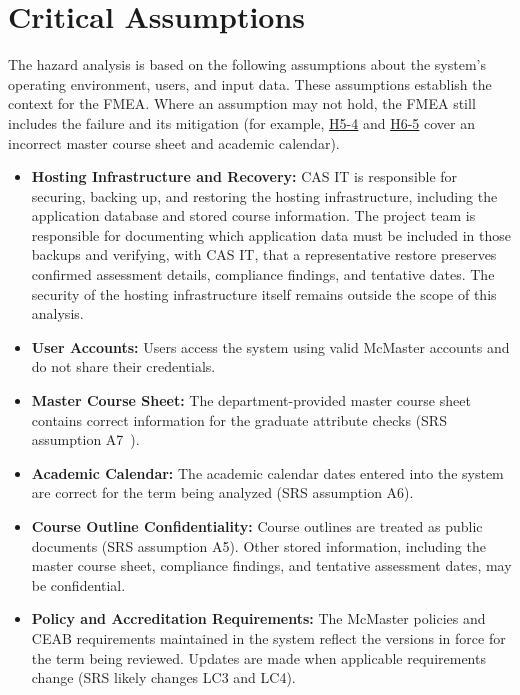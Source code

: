 \documentclass{article}
\newcommand{\hazref}[1]{\hyperref[haz:#1]{#1}}
\begin{document}
\section{Critical Assumptions} \label{sec_Assumptions}


The hazard analysis is based on the following assumptions about the system's operating environment, users, 
and input data. These assumptions establish the context for the FMEA. Where an assumption may not hold, the FMEA 
still includes the failure and its mitigation (for example, \hazref{H5-4} and \hazref{H6-5} cover an incorrect master course 
sheet and academic calendar).

\begin{itemize}
\item \textbf{Hosting Infrastructure and Recovery:} CAS IT is responsible for
securing, backing up, and restoring the hosting infrastructure, including the
application database and stored course information. The project team is
responsible for documenting which application data must be included in those
backups and verifying, with CAS IT, that a representative restore preserves
confirmed assessment details, compliance findings, and tentative dates. The
security of the hosting infrastructure itself remains outside the scope of this
analysis.

\item \textbf{User Accounts:} Users access the system using valid McMaster accounts and do not share their credentials.

\item \textbf{Master Course Sheet:} The department-provided master course sheet contains correct information for the graduate attribute checks (SRS assumption A7~\citep{TeamBVSH2026SRS}).

\item \textbf{Academic Calendar:} The academic calendar dates entered into the system are correct for the term being analyzed (SRS assumption A6).

\item \textbf{Course Outline Confidentiality:} Course outlines are treated as public documents (SRS assumption A5). Other stored information, including the master course sheet, compliance findings, and tentative assessment dates, may be confidential.

\item \textbf{Policy and Accreditation Requirements:} The McMaster policies and CEAB requirements maintained in the system reflect the versions in force for the term being reviewed. Updates are made when applicable requirements change (SRS likely changes LC3 and LC4).

\end{itemize}
\end{document}
